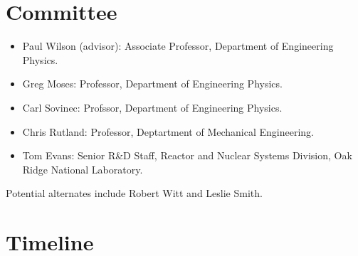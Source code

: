 \documentclass[letterpaper,12pt]{article}
\begin{document}
\section{Committee}

\begin{itemize}
\item Paul Wilson (advisor): Associate Professor, Department of
  Engineering Physics.
\item Greg Moses: Professor, Department of Engineering Physics.
\item Carl Sovinec: Profssor, Department of Engineering Physics.
\item Chris Rutland: Professor, Deptartment of Mechanical Engineering.
\item Tom Evans: Senior R\&D Staff, Reactor and Nuclear Systems
  Division, Oak Ridge National Laboratory.

\end{itemize}

Potential alternates include Robert Witt and Leslie Smith.

\section{Timeline}

\pagebreak


\end{document}
